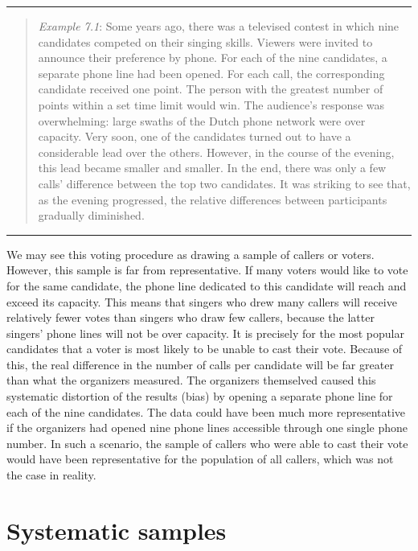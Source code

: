 \documentclass[
]{book}
\begin{document}
\begin{center}\rule{0.5\linewidth}{0.5pt}\end{center}

\begin{quote}
\emph{Example 7.1}: Some years ago, there was a televised contest in which nine candidates competed on their singing skills. Viewers were invited to announce their preference by phone. For each of the nine candidates, a separate phone line had been opened. For each call, the corresponding candidate received one point. The person with the greatest number of points within a set time limit would win. The audience's response was overwhelming: large swaths of the Dutch phone network were over capacity. Very soon, one of the candidates turned out to have a considerable lead over the others. However, in the course of the evening, this lead became smaller and smaller. In the end, there was only a few calls' difference between the top two candidates. It was striking to see that, as the evening progressed, the relative differences between participants gradually diminished.
\end{quote}

\begin{center}\rule{0.5\linewidth}{0.5pt}\end{center}

We may see this voting procedure as drawing a sample of callers or voters. However, this sample is far from representative. If many voters would like to vote for the same candidate, the phone line dedicated to this candidate will reach and exceed its capacity. This means that singers who drew many callers will receive relatively fewer votes than singers who draw few callers, because the latter singers' phone lines will not be over capacity. It is precisely for the most popular candidates that a voter is most likely to be unable to cast their vote. Because of this, the real difference in the number of calls per candidate will be far greater than what the organizers measured. The organizers themselved caused this systematic distortion of the results (bias) by opening a separate phone line for each of the nine candidates. The data could have been much more representative if the organizers had opened nine phone lines accessible through one single phone number. In such a scenario, the sample of callers who were able to cast their vote would have been representative for the population of all callers, which was not the case in reality.

\section{Systematic samples}\label{sec:systematic-samples}
\end{document}
